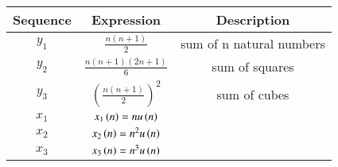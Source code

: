 \begin{tabular}{|c|c|c|}
    \hline
    \textbf{Sequence} & \textbf{Expression} & \textbf{Description} \\
    \hline
    \(y_1\) & \(\frac{n(n+1)}{2}\) & sum of n natural numbers\\
    \hline
    \(y_2\) & \(\frac{n(n+1)(2n+1)}{6}\) & sum of squares\\
    \hline
    \(y_3\) & \(\left(\frac{n(n+1)}{2}\right)^2\) & sum of cubes \\
    \hline
    \(x_1\) & \(x_1\left( n \right) = n u\left( n \right)\) & \\
    \hline
    \(x_2\) & \(x_2\left( n \right) = n^2 u\left( n \right)\) &  \\
    \hline
    \(x_3\) & \(x_3\left( n \right) = n^3 u\left( n \right)\) & \\
    \hline
\end{tabular}

